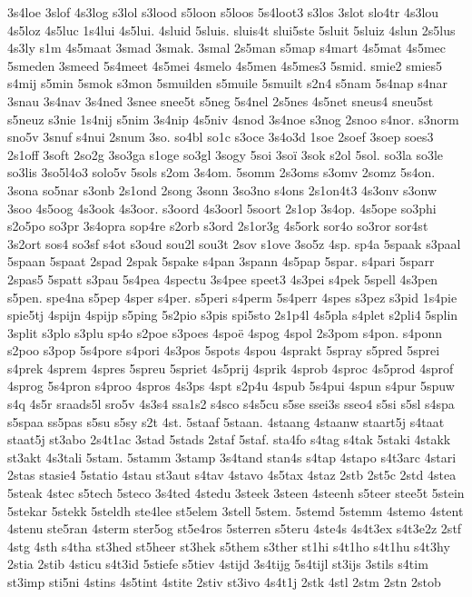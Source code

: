 {3s4loe
3slof
4s3log
s3lol
s3lood
s5loon
s5loos
5s4loot3
s3los
3slot
slo4tr
4s3lou
4s5loz
4s5luc
1s4lui
4s5lui.
4sluid
5sluis.
sluis4t
slui5ste
5sluit
5sluiz
4slun
2s5lus
4s3ly
s1m
4s5maat
3smad
3smak.
3smal
2s5man
s5map
s4mart
4s5mat
4s5mec
5smeden
3smeed
5s4meet
4s5mei
4smelo
4s5men
4s5mes3
5smid.
smie2
smies5
s4mij
s5min
5smok
s3mon
5smuilden
s5muile
5smuilt
s2n4
s5nam
5s4nap
s4nar
3snau
3s4nav
3s4ned
3snee
snee5t
s5neg
5s4nel
2s5nes
4s5net
sneus4
sneu5st
s5neuz
s3nie
1s4nij
s5nim
3s4nip
4s5niv
4snod
3s4noe
s3nog
2snoo
s4nor.
s3norm
sno5v
3snuf
s4nui
2snum
3so.
so4bl
so1c
s3oce
3s4o3d
1soe
2soef
3soep
soes3
2s1off
3soft
2so2g
3so3ga
s1oge
so3gl
3sogy
5soi
3soï
3sok
s2ol
5sol.
so3la
so3le
so3lis
3so5l4o3
solo5v
5sols
s2om
3s4om.
5somm
2s3oms
s3omv
2somz
5s4on.
3sona
so5nar
s3onb
2s1ond
2song
3sonn
3so3no
s4ons
2s1on4t3
4s3onv
s3onw
3soo
4s5oog
4s3ook
4s3oor.
s3oord
4s3oorl
5soort
2s1op
3s4op.
4s5ope
so3phi
s2o5po
so3pr
3s4opra
sop4re
s2orb
s3ord
2s1or3g
4s5ork
sor4o
so3ror
sor4st
3s2ort
sos4
so3sf
s4ot
s3oud
sou2l
sou3t
2sov
s1ove
3so5z
4sp.
sp4a
5spaak
s3paal
5spaan
5spaat
2spad
2spak
5spake
s4pan
3spann
4s5pap
5spar.
s4pari
5sparr
2spas5
5spatt
s3pau
5s4pea
4spectu
3s4pee
speet3
4s3pei
s4pek
5spell
4s3pen
s5pen.
spe4na
s5pep
4sper
s4per.
s5peri
s4perm
5s4perr
4spes
s3pez
s3pid
1s4pie
spie5tj
4spijn
4spijp
s5ping
5s2pio
s3pis
spi5sto
2s1p4l
4s5pla
s4plet
s2pli4
5splin
3split
s3plo
s3plu
sp4o
s2poe
s3poes
4spoë
4spog
4spol
2s3pom
s4pon.
s4ponn
s2poo
s3pop
5s4pore
s4pori
4s3pos
5spots
4spou
4sprakt
5spray
s5pred
5sprei
s4prek
4sprem
4spres
5spreu
5spriet
4s5prij
4sprik
4sprob
4sproc
4s5prod
4sprof
4sprog
5s4pron
s4proo
4spros
4s3ps
4spt
s2p4u
4spub
5s4pui
4spun
s4pur
5spuw
s4q
4s5r
sraads5l
sro5v
4s3s4
ssa1s2
s4sco
s4s5cu
s5se
ssei3s
sseo4
s5si
s5sl
s4spa
s5spaa
ss5pas
s5su
s5sy
s2t
4st.
5staaf
5staan.
4staang
4staanw
staart5j
s4taat
staat5j
st3abo
2s4t1ac
3stad
5stads
2staf
5staf.
sta4fo
s4tag
s4tak
5staki
4stakk
st3akt
4s3tali
5stam.
5stamm
3stamp
3s4tand
stan4s
s4tap
4stapo
s4t3arc
4stari
2stas
stasie4
5statio
4stau
st3aut
s4tav
4stavo
4s5tax
4staz
2stb
2st5c
2std
4stea
5steak
4stec
s5tech
5steco
3s4ted
4stedu
3steek
3steen
4steenh
s5teer
stee5t
5stein
5stekar
5stekk
5steldh
ste4lee
st5elem
3stell
5stem.
5stemd
5stemm
4stemo
4stent
4stenu
ste5ran
4sterm
ster5og
st5e4ros
5sterren
s5teru
4ste4s
4s4t3ex
s4t3e2z
2stf
4stg
4sth
s4tha
st3hed
st5heer
st3hek
s5them
s3ther
st1hi
s4t1ho
s4t1hu
s4t3hy
2stia
2stib
4sticu
s4t3id
5stiefe
s5tiev
4stijd
3s4tijg
5s4tijl
st3ijs
3stils
s4tim
st3imp
sti5ni
4stins
4s5tint
4stite
2stiv
st3ivo
4s4t1j
2stk
4stl
2stm
2stn
2stob
}
